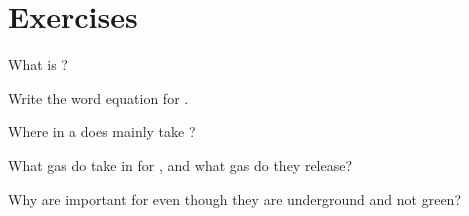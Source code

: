 \section{Exercises}

\begin{exercise}[$\star$]\label{exo:g5:photosynthesis:1}
What is ?
\end{exercise}

\begin{exercise}[$\star$]\label{exo:g5:photosynthesis:2}
Write the word equation for .
\end{exercise}

\begin{exercise}[$\star$]\label{exo:g5:photosynthesis:3}
Where in a   does  mainly take ?
\end{exercise}

\begin{exercise}[$\star$]\label{exo:g5:photosynthesis:4}
What gas do  take in for , and what gas do they
release?
\end{exercise}

\begin{exercise}[$\star\star$]\label{exo:g5:photosynthesis:5}
Why are  important for  even though they are
underground and not green?
\end{exercise}


